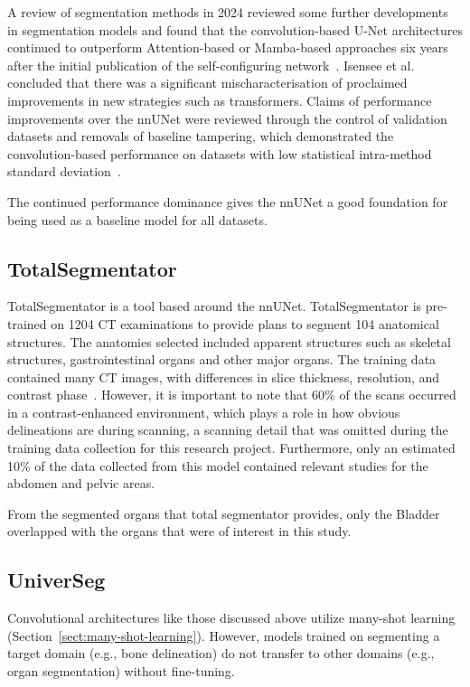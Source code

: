\documentclass[12pt,twoside]{report}
\begin{document}
A review of segmentation methods in 2024 reviewed some further developments in segmentation models and found that the convolution-based U-Net architectures continued to outperform Attention-based or Mamba-based approaches six years after the initial publication of the self-configuring network~\cite{isensee2024nnunet}. Isensee et al. concluded that there was a significant mischaracterisation of proclaimed improvements in new strategies such as transformers. Claims of performance improvements over the nnUNet were reviewed through the control of validation datasets and removals of baseline tampering, which demonstrated the convolution-based performance on datasets with low statistical intra-method standard deviation~\cite{isensee2024nnunet}.

The continued performance dominance gives the nnUNet a good foundation for being used as a baseline model for all datasets.

\subsection{TotalSegmentator}

TotalSegmentator is a tool based around the nnUNet. TotalSegmentator is pre-trained on 1204 CT examinations to provide plans to segment 104 anatomical structures. The anatomies selected included apparent structures such as skeletal structures, gastrointestinal organs and other major organs. The training data contained many CT images, with differences in slice thickness, resolution, and contrast phase~\cite{totalsegmentor-paper}. However, it is important to note that 60\% of the scans occurred in a contrast-enhanced environment, which plays a role in how obvious delineations are during scanning, a scanning detail that was omitted during the training data collection for this research project. Furthermore, only an estimated 10\% of the data collected from this model contained relevant studies for the abdomen and pelvic areas.

From the segmented organs that total segmentator provides, only the Bladder overlapped with the organs that were of interest in this study.

\subsection{UniverSeg}\label{sect:universeg}

Convolutional architectures like those discussed above utilize many-shot learning (Section~\ref{sect:many-shot-learning}). However, models trained on segmenting a target domain (e.g., bone delineation) do not transfer to other domains (e.g., organ segmentation) without fine-tuning.
\end{document}
